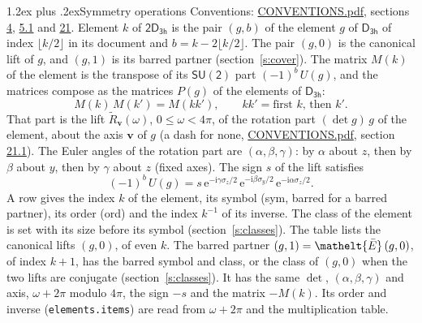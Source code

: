 \documentclass[10pt,a4paper]{article}
\makeatletter
\renewcommand\section{\@startsection{section}{1}{\z@}{-3ex plus -1ex minus -.2ex}%
  {1.2ex plus .2ex}{\normalfont\large\sffamily\bfseries\color{parttitle}}}
\numberwithin{equation}{section}
\newcommand{\eltfont}[1]{{\let\sigma\eltsigma\mathelt{#1}}}
\newcommand{\grp}[1]{\mathsf{#1}}
\newcommand{\elt}[1]{\eltfont{#1}}
\newcommand{\vv}{\mathbf{v}}
\newcommand{\iunit}{\mathrm{i}}
\newcommand{\expe}{\mathrm{e}}
\newcommand{\barred}[1]{\bar{#1}}
\newcommand{\lift}[1]{\tilde{#1}}
\newcommand{\pauli}[1]{\sigma_{#1}}
\makeatother
\begin{document}
\section{Symmetry operations}\label{s:elements}
Conventions: \href{../../CONVENTIONS.pdf}{CONVENTIONS.pdf}, sections \href{../../../rotation/CONVENTIONS.pdf\#conv.4}{4}, \href{../../../rotation/CONVENTIONS.pdf\#conv.5.1}{5.1} and \href{../../CONVENTIONS.pdf\#conv.21}{21}.
\leavevmode\label{n:index.element}\label{n:element.g}Element $k$ of $\grp{2D_{3h}}$ is the pair $(g, b)$ of the element $g$ of \href{../../../rotation/data/pdf/D3h.pdf}{$\grp{D_{3h}}$} of index $\lfloor k/2\rfloor$ in its document and $b = k - 2\lfloor k/2\rfloor$. The pair $(g, 0)$ is the canonical lift of $g$, and $(g, 1)$ is its barred partner (section~\ref{s:cover}). \label{n:matrix.element.pin}\label{n:matrix.element}The matrix $M(k)$ of the element is the transpose of its $\grp{SU(2)}$ part $(-1)^{b}\,U(g)$, and the matrices compose as the matrices $P(g)$ of the elements of $\grp{D_{3h}}$:
\begin{equation}\label{e:mprod}M(k)\,M(k') = M(kk'),\qquad kk' = \text{first } k\text{, then } k'.\end{equation}
\leavevmode\label{n:angle.omega}\label{n:vector.axis}\label{n:vector.pole}That part is the lift $\lift{R}_{\vv}(\omega)$, $0 \le \omega < 4\pi$, of the rotation part $(\det g)\,g$ of the element, about the axis $\vv$ of $g$ (a dash for none, \href{../../CONVENTIONS.pdf}{CONVENTIONS.pdf}, section \href{../../CONVENTIONS.pdf\#conv.21.1}{21.1}). \label{n:angle.euler.alpha}\label{n:angle.euler.beta}\label{n:angle.euler.gamma}\label{n:vector.coordinates}The Euler angles of the rotation part are $(\alpha,\beta,\gamma)$: by $\alpha$ about $z$, then by $\beta$ about $y$, then by $\gamma$ about $z$ (fixed axes). \label{n:local.euler.sign}The sign $s$ of the lift satisfies
\begin{equation}\label{e:euler}(-1)^{b}\,U(g) = s\,\expe^{-\iunit\gamma\pauli{z}/2}\,\expe^{-\iunit\beta\pauli{y}/2}\,\expe^{-\iunit\alpha\pauli{z}/2}.\end{equation}
\leavevmode\label{n:index.element.inverse}\label{n:head.sym}\label{n:head.ord}A row gives the index $k$ of the element, its symbol (sym, barred for a barred partner), its order (ord) and the index $k^{-1}$ of its inverse. \label{n:head.class}The class of the element is set with its size before its symbol (section~\ref{s:classes}).
The table lists the canonical lifts $(g, 0)$, of even $k$. The barred partner $(g, 1) = \elt{\barred{E}}\,(g, 0)$, of index $k + 1$, has the barred symbol and class, or the class of $(g, 0)$ when the two lifts are conjugate (section~\ref{s:classes}). It has the same $\det$, $(\alpha,\beta,\gamma)$ and axis, $\omega + 2\pi$ modulo $4\pi$, the sign $-s$ and the matrix $-M(k)$. Its order and inverse (\texttt{elements.items}) are read from $\omega + 2\pi$ and the multiplication table.
\end{document}
